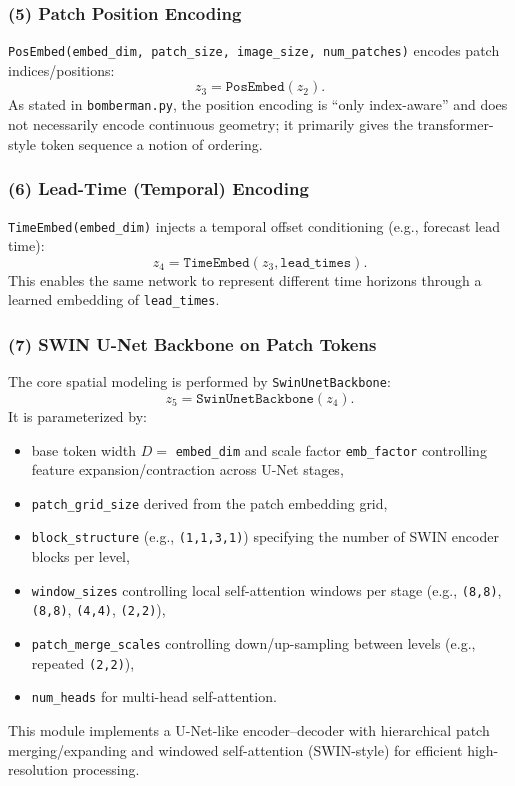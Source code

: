 \documentclass{article} %
\begin{document}
\subsubsection{(5) Patch Position Encoding}
\label{subsec:pos_embed}
\texttt{PosEmbed(embed\_dim, patch\_size, image\_size, num\_patches)} encodes patch indices/positions:
\[
z_3 = \texttt{PosEmbed}(z_2).
\]
As stated in \texttt{bomberman.py}, the position encoding is ``only index-aware'' and does not necessarily encode continuous geometry; it primarily gives the transformer-style token sequence a notion of ordering.

\subsubsection{(6) Lead-Time (Temporal) Encoding}
\label{subsec:time_embed}
\texttt{TimeEmbed(embed\_dim)} injects a temporal offset conditioning (e.g., forecast lead time):
\[
z_4 = \texttt{TimeEmbed}(z_3, \texttt{lead\_times}).
\]
This enables the same network to represent different time horizons through a learned embedding of \texttt{lead\_times}.

\subsubsection{(7) SWIN U-Net Backbone on Patch Tokens}
\label{subsec:swin_unet}
The core spatial modeling is performed by \texttt{SwinUnetBackbone}:
\[
z_5 = \texttt{SwinUnetBackbone}(z_4).
\]
It is parameterized by:
\begin{itemize}
    \item base token width $D=$ \texttt{embed\_dim} and scale factor \texttt{emb\_factor} controlling feature expansion/contraction across U-Net stages,
    \item \texttt{patch\_grid\_size} derived from the patch embedding grid,
    \item \texttt{block\_structure} (e.g., \texttt{(1,1,3,1)}) specifying the number of SWIN encoder blocks per level,
    \item \texttt{window\_sizes} controlling local self-attention windows per stage (e.g., \texttt{(8,8)}, \texttt{(8,8)}, \texttt{(4,4)}, \texttt{(2,2)}),
    \item \texttt{patch\_merge\_scales} controlling down/up-sampling between levels (e.g., repeated \texttt{(2,2)}),
    \item \texttt{num\_heads} for multi-head self-attention.
\end{itemize}
This module implements a U-Net-like encoder--decoder with hierarchical patch merging/expanding and windowed self-attention (SWIN-style) for efficient high-resolution processing.
\end{document}
